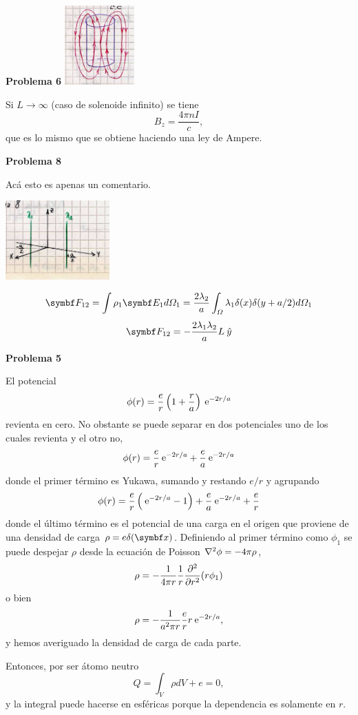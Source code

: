 \documentclass[10pt,oneside]{CBFT_book}
\begin{document}
\begin{ejemplo}{\bf Problema 6}
\includegraphics[width=0.2\textwidth]{images/fig_ft1_setproblemasG1_3.jpg}

Si $L \to \infty$ (caso de solenoide infinito) se tiene 
\[
	B_z = \frac{4 \pi n I}{ c },
\]
que es lo mismo que se obtiene haciendo una ley de Ampere.
 
\end{ejemplo}

\begin{ejemplo}{\bf Problema 8}

Acá esto es apenas un comentario.


\includegraphics[width=0.3\textwidth]{images/fig_ft1_setproblemasG1_4.jpg} 

\[
	\vb{F}_{12} = \int \rho_1 \vb{E}_1 d\Omega_1 =
	\frac{2 \lambda_2 }{a} \int_\Omega \lambda_1 \delta(x) \delta(y+a/2) d\Omega_1
\]
\[
	\vb{F}_{12} = - \frac{2 \lambda_1 \lambda_2 }{a} L \yver
\]
 
\end{ejemplo}

\begin{ejemplo}{\bf Problema 5}

El potencial
\[
	\phi(r) = \frac{e}{r} \left( 1 + \frac{r}{a} \right) \euler^{-2r/a}
\] 
revienta en cero. No obstante se puede separar en dos potenciales uno de los cuales revienta y el otro no,
\[
	\phi(r) = \frac{e}{r} \euler^{-2r/a} +  \frac{e}{a} \euler^{-2r/a}
\]
donde el primer término es Yukawa, sumando y restando $e/r$ y agrupando
\[
	\phi(r) = \frac{e}{r} \left( \euler^{-2r/a} - 1\right) + \frac{e}{a} \euler^{-2r/a} + \frac{e}{r}
\]
donde el último término es el potencial de una carga en el origen que proviene de una densidad de
carga $\rho = e\delta(\vb{x})$. Definiendo al primer término como $\phi_1$ se puede despejar $\rho$
desde la ecuación de Poisson $ \lapm{\phi} = -4\pi \rho$,
\[
	\rho = -\frac{1}{4\pi r} \frac{1}{r} \dpar[2]{}{r}(r\phi_1)
\]
o bien
\[
	\rho = -\frac{1}{a^2 \pi r} \frac{e}{r} r \euler^{-2r/a}, 
\]
y hemos averiguado la densidad de carga de cada parte.

Entonces, por ser átomo neutro
\[
	Q = \int_V \rho dV + e = 0,
\]
y la integral puede hacerse en esféricas porque la dependencia es solamente en $r$.

\end{ejemplo}




\end{document}
